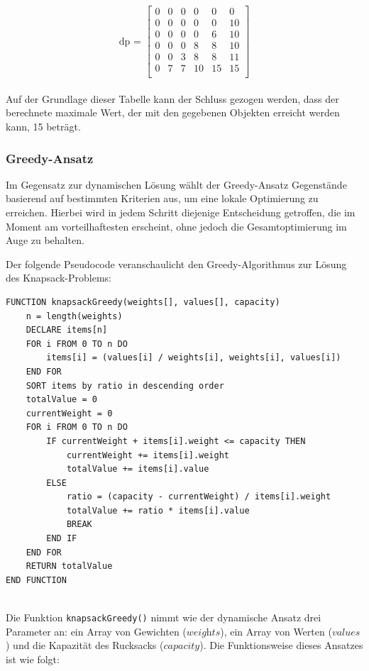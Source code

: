 \begin{itemize}
\[
\text{dp = }
\left[
\begin{array}{cccccc}
0 & 0 & 0 & 0 & 0 & 0 \\
0 & 0 & 0 & 0 & 0 & 10 \\
0 & 0 & 0 & 0 & 6 & 10 \\
0 & 0 & 0 & 8 & 8 & 10 \\
0 & 0 & 3 & 8 & 8 & 11 \\
0 & 7 & 7 & 10 & 15 & 15 \\
\end{array}
\right]
\]
\\
Auf der Grundlage dieser Tabelle kann der Schluss gezogen werden, dass der berechnete maximale Wert, der mit den gegebenen Objekten erreicht werden kann, 15 beträgt.

\subsubsection{Greedy-Ansatz}
Im Gegensatz zur dynamischen Lösung wählt der Greedy-Ansatz Gegenstände basierend auf bestimmten Kriterien aus, um eine
lokale Optimierung zu erreichen. Hierbei wird in jedem Schritt diejenige Entscheidung getroffen, die im Moment am
vorteilhaftesten erscheint, ohne jedoch die Gesamtoptimierung im Auge zu behalten.

Der folgende Pseudocode veranschaulicht den Greedy-Algorithmus zur Lösung des Knapsack-Problems:

\begin{lstlisting}[style=csharp, caption={Greedy Algorithmus}]
FUNCTION knapsackGreedy(weights[], values[], capacity)
    n = length(weights)
    DECLARE items[n]
    FOR i FROM 0 TO n DO
        items[i] = (values[i] / weights[i], weights[i], values[i])
    END FOR
    SORT items by ratio in descending order
    totalValue = 0
    currentWeight = 0
    FOR i FROM 0 TO n DO
        IF currentWeight + items[i].weight <= capacity THEN
            currentWeight += items[i].weight
            totalValue += items[i].value
        ELSE
            ratio = (capacity - currentWeight) / items[i].weight
            totalValue += ratio * items[i].value
            BREAK
        END IF
    END FOR
    RETURN totalValue
END FUNCTION
\end{lstlisting}\\
Die Funktion \texttt{knapsackGreedy()} nimmt wie der dynamische Ansatz drei Parameter an: ein Array von Gewichten (\( \textit{weights} \)),
ein Array von Werten (\( \textit{values} \)) und die Kapazität des Rucksacks (\( \textit{capacity} \)). Die Funktionsweise
dieses Ansatzes ist wie folgt:


\end{itemize}
